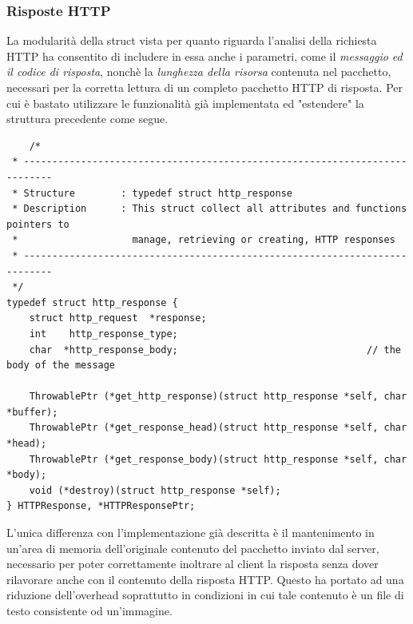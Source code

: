 \documentclass[italian]{tktltiki2}
\begin{document}
\subsubsection*{Risposte HTTP}
La modularità della struct vista per quanto riguarda l'analisi della richiesta HTTP ha consentito di includere in essa anche i parametri, come il \emph{messaggio ed il codice di risposta}, nonchè la \emph{lunghezza della risorsa} contenuta nel pacchetto, necessari per la corretta lettura di un completo pacchetto HTTP di risposta. Per cui è bastato utilizzare le funzionalità già implementata ed "estendere" la struttura precedente come segue.
\begin{lstlisting}
	/*
 * ---------------------------------------------------------------------------
 * Structure        : typedef struct http_response
 * Description      : This struct collect all attributes and functions pointers to
 *                    manage, retrieving or creating, HTTP responses
 * ---------------------------------------------------------------------------
 */
typedef struct http_response {
    struct http_request  *response;                           
    int    http_response_type;                                 
    char  *http_response_body;                                 // the body of the message

    ThrowablePtr (*get_http_response)(struct http_response *self, char *buffer);
    ThrowablePtr (*get_response_head)(struct http_response *self, char *head);
    ThrowablePtr (*get_response_body)(struct http_response *self, char *body);
    void (*destroy)(struct http_response *self);
} HTTPResponse, *HTTPResponsePtr;

\end{lstlisting}
L'unica differenza con l'implementazione già descritta è il mantenimento in un'area di memoria dell'originale contenuto del pacchetto inviato dal server, necessario per poter correttamente inoltrare al client la risposta senza dover rilavorare anche con il contenuto della risposta HTTP. Questo ha portato ad una riduzione dell'overhead soprattutto in condizioni in cui tale contenuto è un file di testo consistente od un'immagine.
\end{document}
